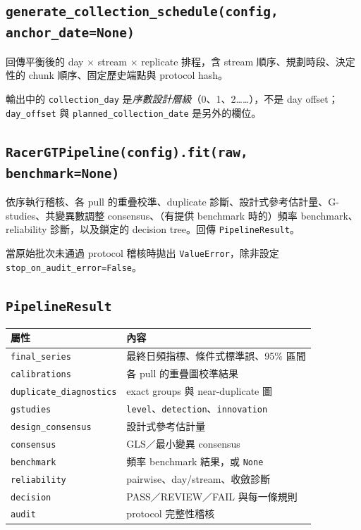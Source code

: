 \documentclass[12pt,a4paper,oneside]{article}
\begin{document}
\subsection{\texttt{generate\_collection\_schedule(config, anchor\_date=None)}}

回傳平衡後的 day $\times$ stream $\times$ replicate 排程，含 stream 順序、規劃時段、決定性的 chunk 順序、固定歷史端點與 protocol hash。

\begin{remark}
輸出中的 \texttt{collection\_day} 是\emph{序數設計層級}（0、1、2……），不是 day offset；\texttt{day\_offset} 與 \texttt{planned\_collection\_date} 是另外的欄位。
\end{remark}

\subsection{\texttt{RacerGTPipeline(config).fit(raw, benchmark=None)}}

依序執行稽核、各 pull 的重疊校準、duplicate 診斷、設計式參考估計量、G-studies、共變異數調整 consensus、（有提供 benchmark 時的）頻率 benchmark、reliability 診斷，以及鎖定的 decision tree。回傳 \texttt{PipelineResult}。

當原始批次未通過 protocol 稽核時拋出 \texttt{ValueError}，除非設定 \texttt{stop\_on\_audit\_error=False}。

\subsection{\texttt{PipelineResult}}

\begin{table}[H]
\centering\small
\begin{tabularx}{\textwidth}{lX}
\toprule
屬性 & 內容\\
\midrule
\texttt{final\_series} & 最終日頻指標、條件式標準誤、95\% 區間\\
\texttt{calibrations} & 各 pull 的重疊圖校準結果\\
\texttt{duplicate\_diagnostics} & exact groups 與 near-duplicate 圖\\
\texttt{gstudies} & \texttt{level}、\texttt{detection}、\texttt{innovation}\\
\texttt{design\_consensus} & 設計式參考估計量\\
\texttt{consensus} & GLS／最小變異 consensus\\
\texttt{benchmark} & 頻率 benchmark 結果，或 \texttt{None}\\
\texttt{reliability} & pairwise、day/stream、收斂診斷\\
\texttt{decision} & PASS／REVIEW／FAIL 與每一條規則\\
\texttt{audit} & protocol 完整性稽核\\
\bottomrule
\end{tabularx}
\end{table}
\end{document}
